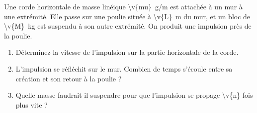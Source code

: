 Une corde horizontale de masse linéique \qty{\v{mu}}{g/m} est attachée à un mur à une extrémité. Elle passe sur une poulie située à \qty{\v{L}}{m} du mur, et un bloc de \qty{\v{M}}{kg} est suspendu à son autre extrémité. On produit une impulsion près de la poulie.

\begin{enumerate}[label=\alph*)]
    \item Déterminez la vitesse de l'impulsion sur la partie horizontale de la corde.
    \item L'impulsion se réfléchit sur le mur. Combien de temps s'écoule entre sa création et son retour à la poulie ?
    \item Quelle masse faudrait-il suspendre pour que l'impulsion se propage \num{\v{n}} fois plus vite ?
\end{enumerate}
